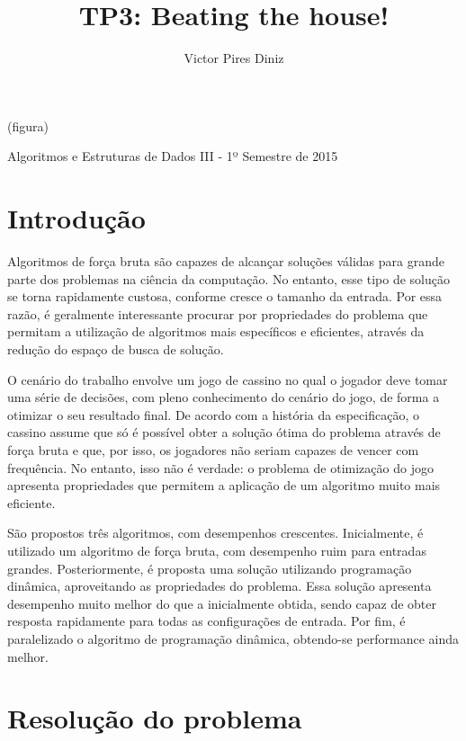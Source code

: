 \documentclass[10pt,a4paper]{article}
\title{TP3: Beating the house!}
\author{Victor Pires Diniz}
\numberwithin{equation}{section}
\begin{document}
\maketitle
\begin{center}

(figura)

Algoritmos e Estruturas de Dados III - 1º Semestre de 2015
\end{center}

\section{Introdução}

Algoritmos de força bruta são capazes de alcançar soluções válidas para grande parte dos problemas na ciência da computação. No entanto, esse tipo de solução se torna rapidamente custosa, conforme cresce o tamanho da entrada. Por essa razão, é geralmente interessante procurar por propriedades do problema que permitam a utilização de algoritmos mais específicos e eficientes, através da redução do espaço de busca de solução.

O cenário do trabalho envolve um jogo de cassino no qual o jogador deve tomar uma série de decisões, com pleno conhecimento do cenário do jogo, de forma a otimizar o seu resultado final. De acordo com a história da especificação, o cassino assume que só é possível obter a solução ótima do problema através de força bruta e que, por isso, os jogadores não seriam capazes de vencer com frequência. No entanto, isso não é verdade: o problema de otimização do jogo apresenta propriedades que permitem a aplicação de um algoritmo muito mais eficiente.

São propostos três algoritmos, com desempenhos crescentes. Inicialmente, é utilizado um algoritmo de força bruta, com desempenho ruim para entradas grandes. Posteriormente, é proposta uma solução utilizando programação dinâmica, aproveitando as propriedades do problema. Essa solução apresenta desempenho muito melhor do que a inicialmente obtida, sendo capaz de obter resposta rapidamente para todas as configurações de entrada. Por fim, é paralelizado o algoritmo de programação dinâmica, obtendo-se performance ainda melhor.

\section{Resolução do problema}
\end{document}
